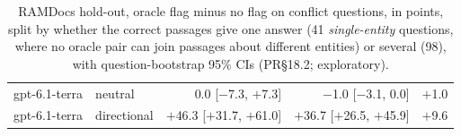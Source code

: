 \begin{table}[t]
\begin{tabular}{@{}llrrr@{}}
gpt-6.1-terra & neutral & 0.0 [$-$7.3, $+$7.3] & $-$1.0 [$-$3.1, 0.0] & $+$1.0 \\
gpt-6.1-terra & directional & $+$46.3 [$+$31.7, $+$61.0] & $+$36.7 [$+$26.5, $+$45.9] & $+$9.6 \\
\bottomrule
\end{tabular}
\caption{RAMDocs hold-out, oracle flag minus no flag on conflict questions, in points, split by whether the correct
passages give one answer (41 \emph{single-entity} questions, where no oracle pair
can join passages about different entities) or several (98), with question-bootstrap
95\% CIs (PR\S18.2; exploratory).}
\label{tab:entity}
\end{table}

